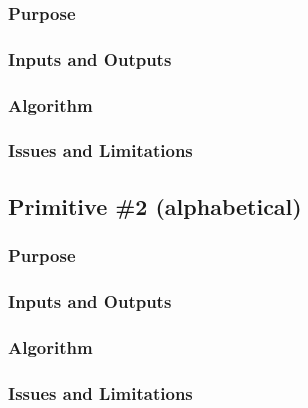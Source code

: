 \documentclass[letterpaper,10pt,english]{sphinxmanual}
\begin{document}
\subsubsection{Purpose}
\label{GNIRS/primitives_pages/primitive1:purpose}

\subsubsection{Inputs and Outputs}
\label{GNIRS/primitives_pages/primitive1:inputs-and-outputs}

\subsubsection{Algorithm}
\label{GNIRS/primitives_pages/primitive1:algorithm}

\subsubsection{Issues and Limitations}
\label{GNIRS/primitives_pages/primitive1:issues-and-limitations}

\subsection{Primitive \#2  (alphabetical)}
\label{GNIRS/primitives_pages/primitive2:gnirs-primitive-2}\label{GNIRS/primitives_pages/primitive2::doc}\label{GNIRS/primitives_pages/primitive2:primitive-2-alphabetical}

\subsubsection{Purpose}
\label{GNIRS/primitives_pages/primitive2:purpose}

\subsubsection{Inputs and Outputs}
\label{GNIRS/primitives_pages/primitive2:inputs-and-outputs}

\subsubsection{Algorithm}
\label{GNIRS/primitives_pages/primitive2:algorithm}

\subsubsection{Issues and Limitations}
\label{GNIRS/primitives_pages/primitive2:issues-and-limitations}
\end{document}
